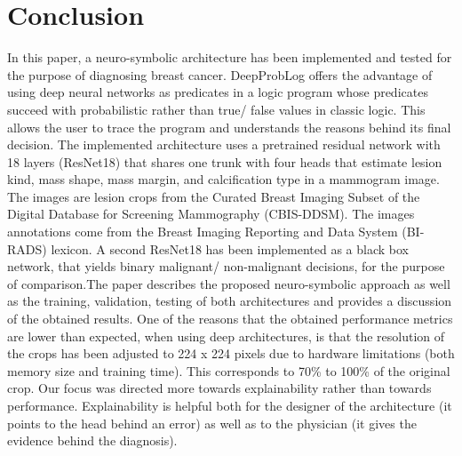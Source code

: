 \section{Conclusion}
\label{sec:conclusion}

In this paper, a neuro-symbolic architecture has been implemented and tested for the purpose of diagnosing breast cancer. DeepProbLog offers the advantage of using deep neural networks as predicates in a logic program whose predicates succeed with probabilistic rather than true/ false values in classic logic. This allows the user to trace the program and understands the reasons behind its final decision. The implemented architecture uses a pretrained residual network with 18 layers (ResNet18) that shares one trunk with four heads that estimate lesion kind, mass shape, mass margin, and calcification type in a mammogram image. The images are lesion
crops from the Curated Breast Imaging Subset of the Digital Database for Screening Mammography (CBIS-DDSM). The images annotations come from the Breast Imaging
Reporting and Data System (BI-RADS) lexicon. A second ResNet18 has been implemented as a black box network, that yields binary malignant/ non-malignant decisions, for the purpose of comparison.The paper describes the proposed neuro-symbolic approach as well as the training, validation, testing of both architectures and provides a discussion of the obtained results. One of the reasons that the obtained performance metrics are lower than expected, when using deep architectures, is that the resolution of the crops has been adjusted to 224 x 224 pixels due to hardware limitations (both memory size and training time). This corresponds to 70\% to 100\% of the original crop.  Our focus was directed more towards explainability rather than towards performance. Explainability is helpful both for the designer of the architecture (it points to the head behind an error) as well as to the physician (it gives the evidence behind the diagnosis).
